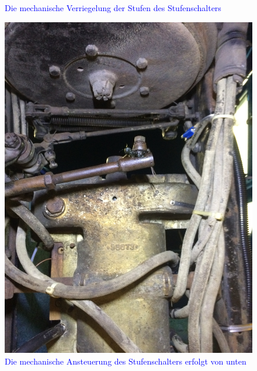 \begin{landscape}
\begin{figure}[h]
	\caption{\textcolor{blue}{Die mechanische Verriegelung der Stufen des Stufenschalters}}
	\label{fig:Stufenschalter_2}
\end{figure}
\begin{figure}[h]
	\centering
		\includegraphics[angle=180,width=1.30\textwidth]{images/Anhang/Stufenschalter_1.jpg}
	\caption{\textcolor{blue}{Die mechanische Ansteuerung des Stufenschalters erfolgt von unten}}
	\label{fig:Stufenschalter_1}
\end{figure}
\begin{figure}[h]
	\centering

\end{figure}
\end{landscape}
